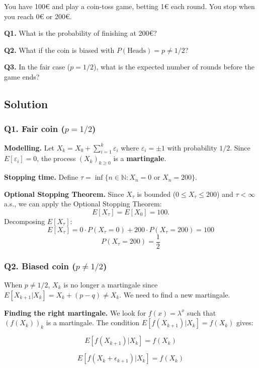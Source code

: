 \begin{exerciseBox}
You have 100€ and play a coin-toss game, betting 1€ each round. You stop when you reach 0€ or 200€.

\textbf{Q1.} What is the probability of finishing at 200€?

\textbf{Q2.} What if the coin is biased with $P(\text{Heads}) = p \neq 1/2$?

\textbf{Q3.} In the fair case ($p = 1/2$), what is the expected number of rounds before the game ends?
\end{exerciseBox}

\subsection*{Solution}

\subsubsection*{Q1. Fair coin ($p = 1/2$)}

\textbf{Modelling.} Let $X_k = X_0 + \sum_{i=1}^{k} \varepsilon_i$ where $\varepsilon_i = \pm 1$ with probability $1/2$. Since $E[\varepsilon_i] = 0$, the process $(X_k)_{k \geq 0}$ is a \textbf{martingale}.

\textbf{Stopping time.} Define $\tau = \inf\{n \in \mathbb{N} : X_n = 0 \text{ or } X_n = 200\}$.

\textbf{Optional Stopping Theorem.} Since $X_\tau$ is bounded ($0 \leq X_\tau \leq 200$) and $\tau < \infty$ a.s., we can apply the Optional Stopping Theorem:
\[
E[X_\tau] = E[X_0] = 100.
\]
Decomposing $E[X_\tau]$:
\[
E[X_\tau] = 0 \cdot P(X_\tau = 0) + 200 \cdot P(X_\tau = 200) = 100
\]
\[
\boxed{P(X_\tau = 200) = \frac{1}{2}}
\]

\subsubsection*{Q2. Biased coin ($p \neq 1/2$)}

When $p \neq 1/2$, $X_k$ is no longer a martingale since $E[X_{k+1} | X_k] = X_k + (p - q) \neq X_k$. We need to find a new martingale.

\textbf{Finding the right martingale.} We look for $f(x) = \lambda^x$ such that $(f(X_k))_k$ is a martingale. The condition $E[f(X_{k+1}) | X_k] = f(X_k)$ gives:

\[
E[f(X_{k+1}) | X_k] = f(X_k)
\]

\[
E[f(X_{k} + \epsilon_{k+1}) | X_k] = f(X_k)
\]

